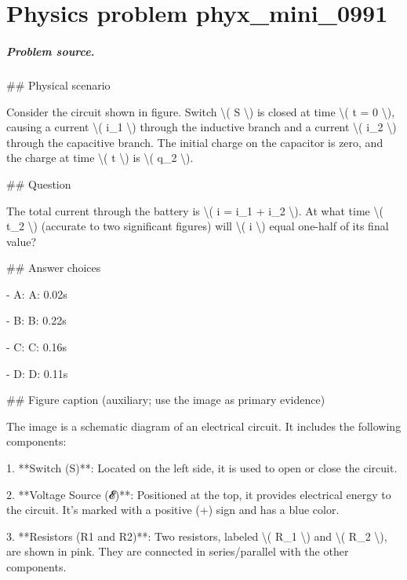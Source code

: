 
\chapter{Physics problem phyx\_mini\_0991}
\label{ch:PhyXMiniProblems_problem_phyx_mini_0991}

\paragraph{Problem source.}
\#\# Physical scenario

Consider the circuit shown in figure. Switch \textbackslash{}( S \textbackslash{}) is closed at time \textbackslash{}( t = 0 \textbackslash{}), causing a current \textbackslash{}( i\_1 \textbackslash{}) through the inductive branch and a current \textbackslash{}( i\_2 \textbackslash{}) through the capacitive branch. The initial charge on the capacitor is zero, and the charge at time \textbackslash{}( t \textbackslash{}) is \textbackslash{}( q\_2 \textbackslash{}).

\#\# Question

The total current through the battery is \textbackslash{}( i = i\_1 + i\_2 \textbackslash{}). At what time \textbackslash{}( t\_2 \textbackslash{}) (accurate to two significant figures) will \textbackslash{}( i \textbackslash{}) equal one-half of its final value?

\#\# Answer choices

- A: A: 0.02s

- B: B: 0.22s

- C: C: 0.16s

- D: D: 0.11s

\#\# Figure caption (auxiliary; use the image as primary evidence)

The image is a schematic diagram of an electrical circuit. It includes the following components:

1. **Switch (S)**: Located on the left side, it is used to open or close the circuit.

2. **Voltage Source (𝓔)**: Positioned at the top, it provides electrical energy to the circuit. It's marked with a positive (+) sign and has a blue color.

3. **Resistors (R1 and R2)**: Two resistors, labeled \textbackslash{}( R\_1 \textbackslash{}) and \textbackslash{}( R\_2 \textbackslash{}), are shown in pink. They are connected in series/parallel with the other components.

